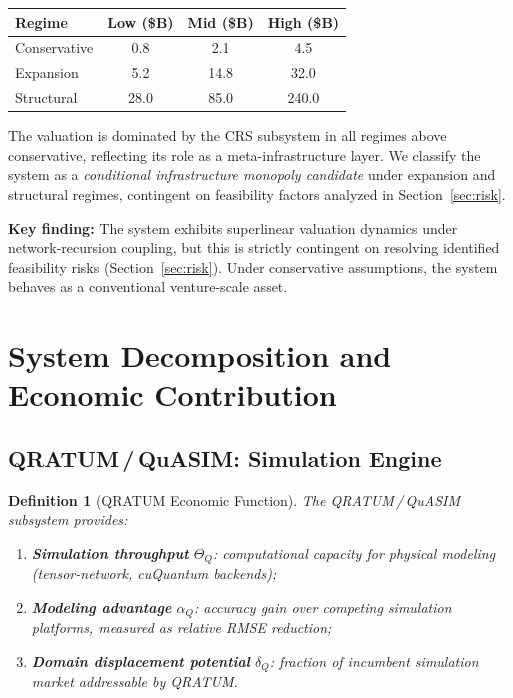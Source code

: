 \documentclass[11pt,a4paper]{article}
\newtheorem{definition}{Definition}[section]
\theoremstyle{remark}
\begin{document}
\begin{center}
\renewcommand{\arraystretch}{1.3}
\begin{tabular}{lccc}
\toprule
\textbf{Regime} & \textbf{Low (\$B)} & \textbf{Mid (\$B)} & \textbf{High (\$B)} \\
\midrule
Conservative   & 0.8  & 2.1  & 4.5   \\
Expansion      & 5.2  & 14.8 & 32.0  \\
Structural     & 28.0 & 85.0 & 240.0 \\
\bottomrule
\end{tabular}
\end{center}

\noindent
The valuation is dominated by the CRS subsystem in all regimes
above conservative, reflecting its role as a meta-infrastructure
layer.  We classify the system as a \emph{conditional infrastructure
monopoly candidate} under expansion and structural regimes, contingent
on feasibility factors analyzed in Section~\ref{sec:risk}.

\medskip
\noindent\textbf{Key finding:} The system exhibits superlinear
valuation dynamics under network-recursion coupling, but this is
strictly contingent on resolving identified feasibility risks
(Section~\ref{sec:risk}).  Under conservative assumptions, the
system behaves as a conventional venture-scale asset.


\section{System Decomposition and Economic Contribution}
\label{sec:decomposition}

\subsection{QRATUM\,/\,QuASIM: Simulation Engine}
\label{subsec:qratum}

\begin{definition}[QRATUM Economic Function]
\label{def:qratum_econ}
The QRATUM\,/\,QuASIM subsystem provides:
\begin{enumerate}[nosep]
  \item \textbf{Simulation throughput} $\Theta_Q$: computational
        capacity for physical modeling (tensor-network, cuQuantum
        backends);
  \item \textbf{Modeling advantage} $\alpha_Q$: accuracy gain over
        competing simulation platforms, measured as relative RMSE
        reduction;
  \item \textbf{Domain displacement potential} $\delta_Q$: fraction
        of incumbent simulation market addressable by QRATUM.
\end{enumerate}
\end{definition}
\end{document}
